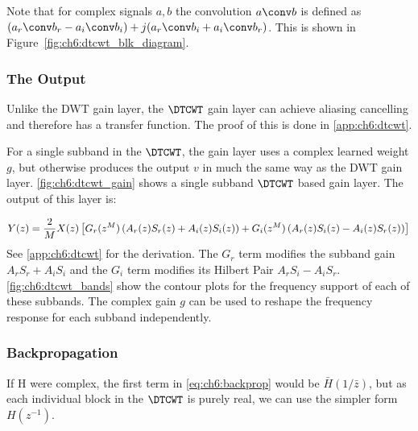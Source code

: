 Note that for complex signals $a, b$ the convolution $a \conv b$ is defined as $(a_r \conv
b_r - a_i \conv b_i) + j(a_r \conv b_i + a_i \conv b_r)$. This is shown 
in Figure~\autoref{fig:ch6:dtcwt_blk_diagram}.

\subsubsection{The Output}
Unlike the DWT gain layer, the $\DTCWT$ gain layer can achieve aliasing
cancelling and therefore has a transfer function. The proof of this is done in
\autoref{app:ch6:dtcwt}. 

\begin{figure}[ht!]
  \centering
  
  \label{fig:ch6:dtcwt_gain}
\end{figure}

For a single subband in the $\DTCWT$, the gain layer uses a complex learned
weight $g$, but otherwise produces the output $v$ in much the same way as the
DWT gain layer. \autoref{fig:ch6:dtcwt_gain} shows a single subband $\DTCWT$
based gain layer. The output of this layer is:

\begin{equation}\label{eq:ch6:dtcwt_fwd}
  Y(z) = \frac{2}{M}X(z) \left[G_r(z^{M}) \left(A_r(z)S_r(z) + A_i(z)S_i(z)\right)
  + G_i(z^{M}) \left(A_r(z)S_i(z) - A_i(z)S_r(z)\right) \right] \\
\end{equation}
See \autoref{app:ch6:dtcwt} for the derivation. The $G_r$ term modifies the
subband gain $A_rS_r + A_iS_i$ and the $G_i$ term modifies its Hilbert Pair
$A_rS_i - A_iS_r$. \autoref{fig:ch6:dtcwt_bands} show the contour plots for the
frequency support of each of these subbands. The complex gain $g$ can be used to
reshape the frequency response for each subband independently.

\subsubsection{Backpropagation}\label{sec:ch6:dtcwt_update}
If H were complex, the first term in \autoref{eq:ch6:backprop} would be
$\bar{H}(1/\bar{z})$, but as each individual block in the $\DTCWT$ is purely
real, we can use the simpler form $H(z^{-1})$. 

